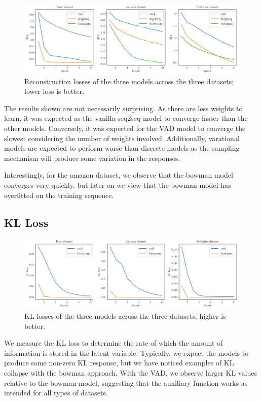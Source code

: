\documentclass[12pt,twoside]{report}
\begin{document}
\begin{figure}[!ht]
	\centering
	\includegraphics[width=150mm]{results/nll.pdf}
	\caption{Reconstruction losses of the three models across the three datasets; lower loss is better. \label{r:nll}}
  \end{figure}

The results shown are not necessarily surprising. As there are less weights to learn, it was expected as the vanilla seq2seq model to converge faster than the other models. Conversely, it was expected for the VAD model to converge the slowest considering the number of weights involved. Additionally, varational models are expected to perform worse than discrete models as the sampling mechanism will produce some variation in the responses. 

Interestingly, for the amazon dataset, we observe that the bowman model converges very quickly, but later on we view that the bowman model has overfitted on the training sequence.

\subsection{KL Loss}

\begin{figure}[!ht]
	\centering
	\includegraphics[width=150mm]{results/kl_loss.pdf}
	\caption{KL losses of the three models across the three datasets; higher is better.\label{r:kl_loss}}
	\end{figure}
	
We measure the KL loss to determine the rate of which the amount of information is stored in the latent variable. Typically, we expect the models to produce some non-zero KL response, but we have noticed examples of KL collapse with the bowman approach. With the VAD, we observe larger KL values relative to the bowman model, suggesting that the auxiliary function works as intended for all types of datasets.
\end{document}
